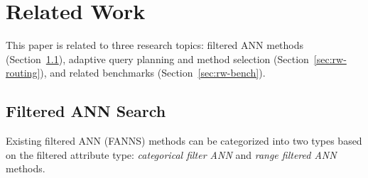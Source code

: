 \section{Related Work}
\label{sec:relatedwork}


This paper is related to three research topics: filtered ANN methods (Section~\ref{sec:rw-fanns}), adaptive query planning and method selection (Section~\ref{sec:rw-routing}), and related benchmarks (Section~\ref{sec:rw-bench}).

\subsection{Filtered ANN Search}
\label{sec:rw-fanns}

Existing filtered ANN (FANNS) methods can be categorized into two types based on the filtered attribute type: \textit{categorical filter ANN} and \textit{range filtered ANN} methods.

